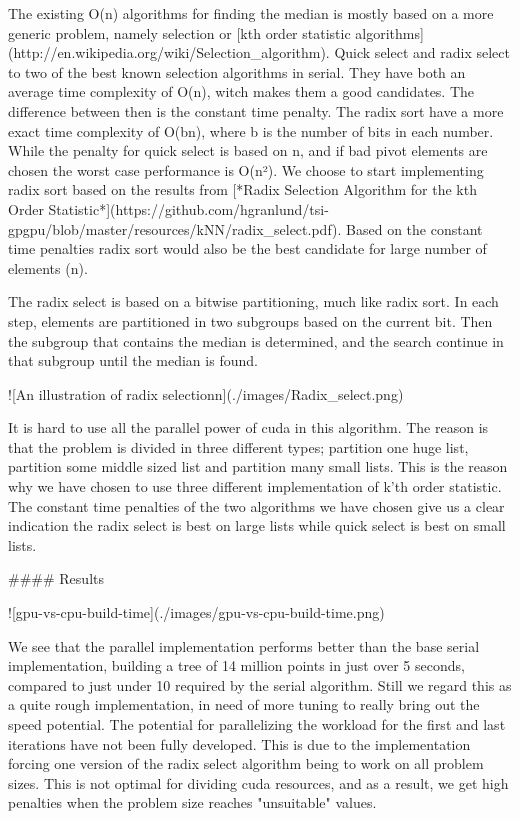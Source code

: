 The existing O(n) algorithms for finding the median is mostly based on a more generic problem, namely selection or [kth order statistic algorithms](http://en.wikipedia.org/wiki/Selection_algorithm). Quick select and radix select to two of the best known selection algorithms in serial. They have both an average time complexity of O(n), witch makes them a good candidates. The difference between then is the constant time penalty. The radix sort have a more exact time complexity of O(bn), where b is the number of bits in each number. While the penalty for quick select is based on n, and if bad pivot elements are chosen the worst case performance is O(n²). We choose to start implementing radix sort based on the results from [*Radix Selection Algorithm for the kth Order Statistic*](https://github.com/hgranlund/tsi-gpgpu/blob/master/resources/kNN/radix_select.pdf). Based on the constant time penalties radix sort would also be the best candidate for large number of elements (n).

The radix select is based on a bitwise partitioning, much like radix sort. In each step, elements are partitioned in two subgroups based on the current bit. Then the subgroup that contains the median is determined, and the search continue in that subgroup until the median is found.

![An illustration of radix selectionn](./images/Radix_select.png)


It is hard to use all the parallel power of cuda in this algorithm. The reason is that the problem is divided in three different types; partition one huge list, partition some middle sized list and partition many small lists. This is the reason why we have chosen to use three different implementation of k'th order statistic. The constant time penalties of the two algorithms we have chosen give us a clear indication the radix select is best on large lists while quick select is best on small lists.

#### Results

![gpu-vs-cpu-build-time](./images/gpu-vs-cpu-build-time.png)

We see that the parallel implementation performs better than the base serial implementation, building a tree of 14 million points in just over 5 seconds, compared to just under 10 required by the serial algorithm. Still we regard this as a quite rough implementation, in need of more tuning to really bring out the speed potential. The potential for parallelizing the workload for the first and last iterations have not been fully developed. This is due to the implementation forcing one version of the radix select algorithm being to work on all problem sizes. This is not optimal for dividing cuda resources, and as a result, we get high penalties when the problem size reaches "unsuitable" values.

